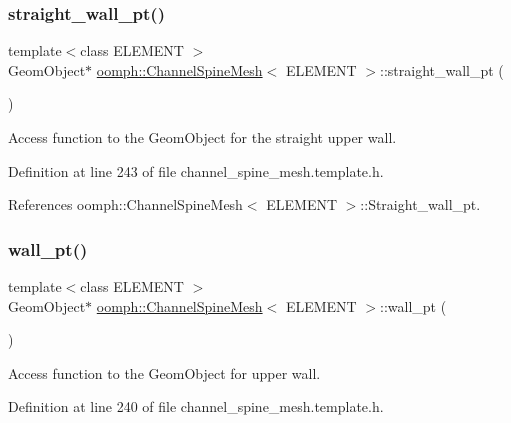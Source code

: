 \subsubsection{\texorpdfstring{straight\+\_\+wall\+\_\+pt()}{straight\_wall\_pt()}}
{\footnotesize\ttfamily template$<$class E\+L\+E\+M\+E\+NT $>$ \\
Geom\+Object$\ast$ \hyperlink{classoomph_1_1ChannelSpineMesh}{oomph\+::\+Channel\+Spine\+Mesh}$<$ E\+L\+E\+M\+E\+NT $>$\+::straight\+\_\+wall\+\_\+pt (\begin{DoxyParamCaption}{ }\end{DoxyParamCaption})\hspace{0.3cm}{\ttfamily [inline]}}



Access function to the Geom\+Object for the straight upper wall. 



Definition at line 243 of file channel\+\_\+spine\+\_\+mesh.\+template.\+h.



References oomph\+::\+Channel\+Spine\+Mesh$<$ E\+L\+E\+M\+E\+N\+T $>$\+::\+Straight\+\_\+wall\+\_\+pt.

\mbox{\label{classoomph_1_1ChannelSpineMesh_a741893ef460f1275f1df43496bb7536c}} 
\subsubsection{\texorpdfstring{wall\+\_\+pt()}{wall\_pt()}}
{\footnotesize\ttfamily template$<$class E\+L\+E\+M\+E\+NT $>$ \\
Geom\+Object$\ast$ \hyperlink{classoomph_1_1ChannelSpineMesh}{oomph\+::\+Channel\+Spine\+Mesh}$<$ E\+L\+E\+M\+E\+NT $>$\+::wall\+\_\+pt (\begin{DoxyParamCaption}{ }\end{DoxyParamCaption})\hspace{0.3cm}{\ttfamily [inline]}}



Access function to the Geom\+Object for upper wall. 



Definition at line 240 of file channel\+\_\+spine\+\_\+mesh.\+template.\+h.



